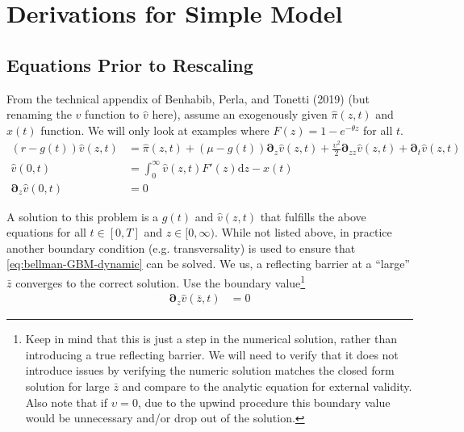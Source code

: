 \documentclass[11pt]{article}
\newcommand{\D}[1][]{\ensuremath{\boldsymbol{\partial}_{#1}}}
\newcommand{\diff}{\ensuremath{\mathrm{d}}}
\begin{document}
\section{Derivations for Simple Model}\label{sec:simple-derivation}
\subsection{Equations Prior to Rescaling}

From the technical appendix of Benhabib, Perla, and Tonetti (2019) (but renaming the $v$ function to $\hat{v}$ here), assume an exogenously given $\hat{\pi}(z,t)$ and $x(t)$ function.  We will only look at examples where $F(z) = 1 - e^{-\theta z}$ for all $t$.
\begin{align}
(r - g(t)) \hat{v}(z,t) &= \hat{\pi}(z,t) + (\mu- g(t)) \D[z] \hat{v}(z,t) + \frac{\upsilon^2}{2} \D[zz] \hat{v}(z,t) + \D[t]\hat{v}(z,t)\label{eq:bellman-GBM-dynamic}	\\
\hat{v}(0,t) &= \int_{0}^{\infty} \hat{v}(z,t) F'(z)\diff z - x(t)\label{eq:vm-GBM-dynamic}\\
\D[z]\hat{v}(0,t) &= 0\label{eq:sp-GBM-dynamic}
\end{align}

A solution to this problem is a $g(t)$ and $\hat{v}(z,t)$ that fulfills the above equations for all $t\in[0,T]$ and $z\in[0,\infty)$.  While not listed above, in practice another boundary condition (e.g. transversality) is used to ensure that \cref{eq:bellman-GBM-dynamic} can be solved. We us, a reflecting barrier at a ``large'' $\bar{z}$ converges to the correct solution.  Use the boundary value\footnote{Keep in mind that this is just a step in the numerical solution, rather than introducing a true reflecting barrier.  We will need to verify that it does not introduce issues by verifying the numeric solution matches the closed form solution for large $\bar{z}$ and compare to the analytic equation for external validity.  Also note that if $\upsilon = 0$, due to the upwind procedure this boundary value would be unnecessary and/or drop out of the solution.}
	\begin{align}
	\D[z]\hat{v}(\bar{z},t) &= 0\label{eq:reflecting-GBM-dynamic}
	\end{align}
\end{document}
